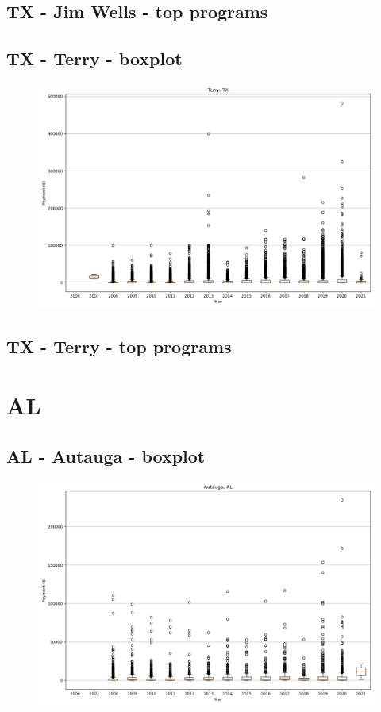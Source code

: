 \subsection*{TX - Jim Wells - top programs}

\newpage
\subsection*{TX - Terry - boxplot}
\begin{figure}[h]
\centering
\includegraphics[width=7in]{../output/boxplots/counties/Terry-TX_boxplot.png}
\end{figure}


\subsection*{TX - Terry - top programs}

\newpage
\section*{AL}
\subsection*{AL - Autauga - boxplot}
\begin{figure}[h]
\centering
\includegraphics[width=7in]{../output/boxplots/counties/Autauga-AL_boxplot.png}
\end{figure}


